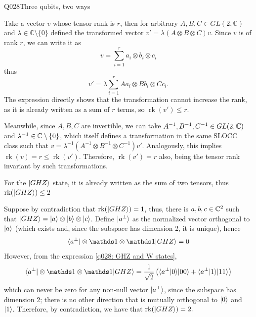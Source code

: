 \begin{entry}{Q028}{Three qubits, two ways}
\begin{problem}
\begin{enumerate}
\end{enumerate}
\end{problem}

\begin{solution}[a]
Take a vector $v$ whose tensor rank is $r$, then for arbitrary $A, B, C \in GL(2,\mathbb{C})$ and
$\lambda \in \mathbb{C}\setminus\{0\}$ defined the transformed vector $v' = \lambda(A\otimes B\otimes C)v$.
Since $v$ is of rank $r$, we can write it as 
\begin{equation}
    v= \sum_{i=1}^ra_i\otimes b_i\otimes c_i
\end{equation}
thus
\begin{equation}
    v' =\lambda\sum_{i=1}^{r} Aa_i\otimes Bb_i\otimes Cc_i.
\end{equation}
The expression directly shows that the transformation cannot increase the rank, as it is already written as a sum of $r$ terms, so $\operatorname{rk}(v')\leq r$.

Meanwhile, since $A,B,C$ are invertible, we can take $A^{-1},B^{-1},C^{-1} \in GL(2,\mathbb{C})$ and $\lambda^{-1} \in \mathbb{C} \setminus \{0\}$, which itself defines a transformation in the same SLOCC class such that $v = \lambda^{-1}(A^{-1}\otimes B^{-1}\otimes C^{-1})v'$. Analogously, this implies $\operatorname{rk}(v)=r\leq \operatorname{rk}(v')$. Therefore, $\operatorname{rk}(v')=r$ also, being the tensor rank invariant by such transformations.

For the $\lvert GHZ \rangle$ state, it is already written as the sum of two tensors, thus $\operatorname{rk}(\lvert GHZ \rangle)\leq 2$

Suppose by contradiction that $\operatorname{rk}(\lvert GHZ \rangle)= 1$, thus, there is $a,b,c\in \mathbb{C}^{2}$ such that $\lvert GHZ \rangle=\lvert a \rangle\otimes\lvert b \rangle\otimes\lvert c \rangle$. Define $\lvert a^{\perp} \rangle$ as the normalized vector orthogonal to $\lvert a \rangle$ (which exists and, since the subspace has dimension 2, it is unique), hence
\begin{equation}
    \bra{a^{\perp}}\otimes\id \otimes \id\ket{GHZ} = 0
\end{equation}
However, from the expression \eqref{q028: GHZ and W states},
\begin{equation}
    \bra{a^{\perp}}\otimes\id \otimes \id\ket{GHZ} = \frac{1}{\sqrt{2}} \left( \braket{a^{\perp}}{0} \ket{00} + \braket{a^{\perp}}{1} \ket{11}\right)
\end{equation}
which can never be zero for any non-null vector $\lvert a^{\perp} \rangle$, since the subspace has dimension 2; there is no other direction that is mutually orthogonal to $\lvert 0 \rangle$ and $\lvert 1 \rangle$. Therefore, by contradiction, we have that $\operatorname{rk}(\lvert GHZ \rangle)=2.$


\end{solution}
\end{entry}
